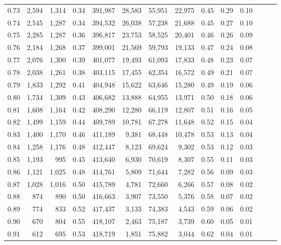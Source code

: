 \begin{tabular}{rrrrrrrrrrrrrr}
0.73 &  2,594 &  1,314 &  0.34 &  391,987 &   28,583 &  55,951 &  22,975 &  0.45 &  0.29 &      0.10 \\
0.74 &  2,545 &  1,287 &  0.34 &  394,532 &   26,038 &  57,238 &  21,688 &  0.45 &  0.27 &      0.10 \\
0.75 &  2,285 &  1,287 &  0.36 &  396,817 &   23,753 &  58,525 &  20,401 &  0.46 &  0.26 &      0.09 \\
0.76 &  2,184 &  1,268 &  0.37 &  399,001 &   21,569 &  59,793 &  19,133 &  0.47 &  0.24 &      0.08 \\
0.77 &  2,076 &  1,300 &  0.39 &  401,077 &   19,493 &  61,093 &  17,833 &  0.48 &  0.23 &      0.07 \\
0.78 &  2,038 &  1,261 &  0.38 &  403,115 &   17,455 &  62,354 &  16,572 &  0.49 &  0.21 &      0.07 \\
0.79 &  1,833 &  1,292 &  0.41 &  404,948 &   15,622 &  63,646 &  15,280 &  0.49 &  0.19 &      0.06 \\
0.80 &  1,734 &  1,309 &  0.43 &  406,682 &   13,888 &  64,955 &  13,971 &  0.50 &  0.18 &      0.06 \\
0.81 &  1,608 &  1,164 &  0.42 &  408,290 &   12,280 &  66,119 &  12,807 &  0.51 &  0.16 &      0.05 \\
0.82 &  1,499 &  1,159 &  0.44 &  409,789 &   10,781 &  67,278 &  11,648 &  0.52 &  0.15 &      0.04 \\
0.83 &  1,400 &  1,170 &  0.46 &  411,189 &    9,381 &  68,448 &  10,478 &  0.53 &  0.13 &      0.04 \\
0.84 &  1,258 &  1,176 &  0.48 &  412,447 &    8,123 &  69,624 &   9,302 &  0.53 &  0.12 &      0.03 \\
0.85 &  1,193 &    995 &  0.45 &  413,640 &    6,930 &  70,619 &   8,307 &  0.55 &  0.11 &      0.03 \\
0.86 &  1,121 &  1,025 &  0.48 &  414,761 &    5,809 &  71,644 &   7,282 &  0.56 &  0.09 &      0.03 \\
0.87 &  1,028 &  1,016 &  0.50 &  415,789 &    4,781 &  72,660 &   6,266 &  0.57 &  0.08 &      0.02 \\
0.88 &    874 &    890 &  0.50 &  416,663 &    3,907 &  73,550 &   5,376 &  0.58 &  0.07 &      0.02 \\
0.89 &    774 &    833 &  0.52 &  417,437 &    3,133 &  74,383 &   4,543 &  0.59 &  0.06 &      0.02 \\
0.90 &    670 &    804 &  0.55 &  418,107 &    2,463 &  75,187 &   3,739 &  0.60 &  0.05 &      0.01 \\
0.91 &    612 &    695 &  0.53 &  418,719 &    1,851 &  75,882 &   3,044 &  0.62 &  0.04 &      0.01 \\

\end{tabular}
